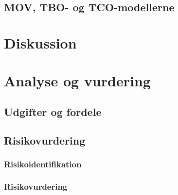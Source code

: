 \documentclass[10pt,a4paper,danish]{article}
\begin{document}
\begin{itemize}




\subsection{MOV, TBO- og TCO-modellerne}

\section{Diskussion}




\section{Analyse og vurdering}



\subsection{Udgifter og fordele}

\subsection{Risikovurdering}




\subsubsection{Risikoidentifikation}

\subsubsection{Risikovurdering}


\end{itemize}
\end{document}
